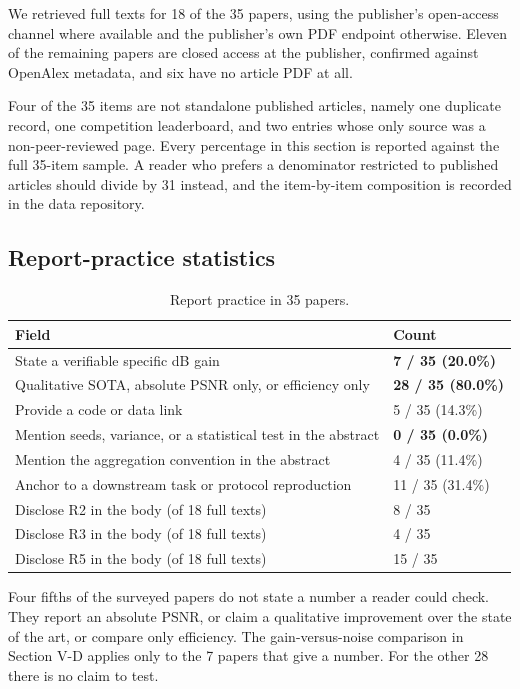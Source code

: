 \documentclass[journal,twoside,10pt]{IEEEtran}
\newlength{\tblavail}
\begin{document}
We retrieved full texts for 18 of the 35 papers, using the publisher's open-access channel where available and the publisher's own PDF endpoint otherwise. Eleven of the remaining papers are closed access at the publisher, confirmed against OpenAlex metadata, and six have no article PDF at all.

Four of the 35 items are not standalone published articles, namely one duplicate record, one competition leaderboard, and two entries whose only source was a non-peer-reviewed page. Every percentage in this section is reported against the full 35-item sample. A reader who prefers a denominator restricted to published articles should divide by 31 instead, and the item-by-item composition is recorded in the data repository.

\subsection{Report-practice statistics}


\begin{table}[!t]
\caption{Report practice in 35 papers.}
\label{tab:VII}
\centering
\small
\setlength{\tabcolsep}{3pt}
\setlength{\tblavail}{\dimexpr\columnwidth-4\tabcolsep\relax}
\begin{tabular}{p{0.676\tblavail}p{0.294\tblavail}}
\hline
Field & Count \\
\hline
State a verifiable specific dB gain & \textbf{7 / 35 (20.0\%)} \\
Qualitative SOTA, absolute PSNR only, or efficiency only & \textbf{28 / 35 (80.0\%)} \\
Provide a code or data link & 5 / 35 (14.3\%) \\
Mention seeds, variance, or a statistical test in the abstract & \textbf{0 / 35 (0.0\%)} \\
Mention the aggregation convention in the abstract & 4 / 35 (11.4\%) \\
Anchor to a downstream task or protocol reproduction & 11 / 35 (31.4\%) \\
Disclose R2 in the body (of 18 full texts) & 8 / 35 \\
Disclose R3 in the body (of 18 full texts) & 4 / 35 \\
Disclose R5 in the body (of 18 full texts) & 15 / 35 \\
\hline
\end{tabular}
\end{table}

Four fifths of the surveyed papers do not state a number a reader could check. They report an absolute PSNR, or claim a qualitative improvement over the state of the art, or compare only efficiency. The gain-versus-noise comparison in Section V-D applies only to the 7 papers that give a number. For the other 28 there is no claim to test.
\end{document}
